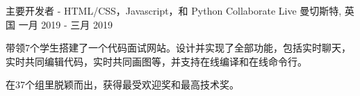 \begin{cventries}
  \cventry
    {主要开发者 - HTML/CSS，Javascript，和 Python} %
    {Collaborate Live} %
    {曼切斯特, 英国} %
    {一月 2019 - 三月 2019} %
    {
      \begin{cvitems} %
        \item {带领7个学生搭建了一个代码面试网站。设计并实现了全部功能，包括实时聊天，实时共同编辑代码，实时共同画图等，并支持在线编译和在线命令行。}
        \item {在37个组里脱颖而出，获得最受欢迎奖和最高技术奖。}
      \end{cvitems}
    }
\end{cventries}
